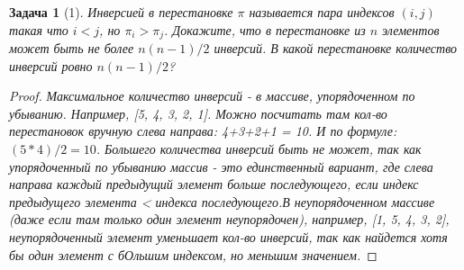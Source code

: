 \documentclass[12pt]{extarticle}
\newtheorem*{problem}{Задача}
\begin{document}
\begin{problem}[1]
{\em Инверсией} в перестановке $\pi$ называется пара индексов $(i,j)$ такая что $i<j$, но $\pi_i>\pi_j$. Докажите, что в перестановке из $n$ элементов может быть не более $n(n-1)/2$ инверсий. В какой перестановке количество инверсий ровно $n(n-1)/2$?
\end{problem}

\begin{proof}

{\em Максимальное количество инверсий - в массиве, упорядоченном по убыванию. Например, [5, 4, 3, 2, 1]. Можно посчитать там кол-во перестановок вручную слева направа: 4+3+2+1 = 10. И по формуле: $(5*4)/2 = 10$. Большего количества инверсий быть не может, так как упорядоченный по убыванию массив - это единственный вариант, где слева направа каждый предыдущий элемент больше последующего, если индекс предыдущего элемента < индекса последующего.В неупорядоченном массиве (даже если там только один элемент неупорядочен), например, [1, 5, 4, 3, 2], неупорядоченный элемент уменьшает кол-во инверсий, так как найдется хотя бы один элемент с бОльшим индексом, но меньшим значением.}

\end{proof}
\end{document}
